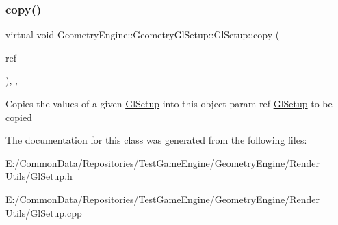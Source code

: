 \subsubsection{\texorpdfstring{copy()}{copy()}}
{\footnotesize\ttfamily virtual void Geometry\+Engine\+::\+Geometry\+Gl\+Setup\+::\+Gl\+Setup\+::copy (\begin{DoxyParamCaption}\item[{const \mbox{\hyperlink{class_geometry_engine_1_1_geometry_gl_setup_1_1_gl_setup}{Gl\+Setup}} \&}]{ref }\end{DoxyParamCaption})\hspace{0.3cm}{\ttfamily [inline]}, {\ttfamily [protected]}, {\ttfamily [virtual]}}

Copies the values of a given \mbox{\hyperlink{class_geometry_engine_1_1_geometry_gl_setup_1_1_gl_setup}{Gl\+Setup}} into this object param ref \mbox{\hyperlink{class_geometry_engine_1_1_geometry_gl_setup_1_1_gl_setup}{Gl\+Setup}} to be copied 

The documentation for this class was generated from the following files\+:\begin{DoxyCompactItemize}
\item 
E\+:/\+Common\+Data/\+Repositories/\+Test\+Game\+Engine/\+Geometry\+Engine/\+Render Utils/Gl\+Setup.\+h\item 
E\+:/\+Common\+Data/\+Repositories/\+Test\+Game\+Engine/\+Geometry\+Engine/\+Render Utils/Gl\+Setup.\+cpp\end{DoxyCompactItemize}
